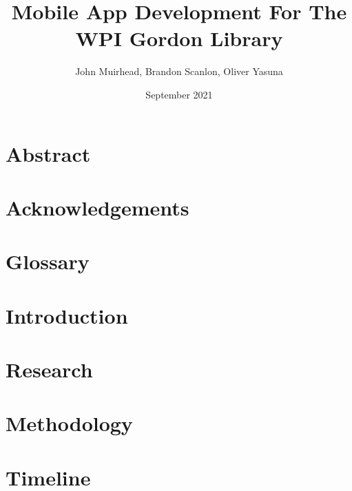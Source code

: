 \documentclass[oneside, 12pt]{book}
\title{Mobile App Development For The WPI Gordon Library}
\author{John Muirhead, Brandon Scanlon, Oliver Yasuna}
\date{September 2021}
\begin{document}
\maketitle

\frontmatter
    \tableofcontents
    \chapter{Abstract}
        
    \chapter{Acknowledgements}
        
    \chapter{Glossary}
        

\mainmatter%
    \chapter{Introduction}
        
    \chapter{Research}
        
    \chapter{Methodology}
        
    \chapter{Timeline}
        
\end{document}
